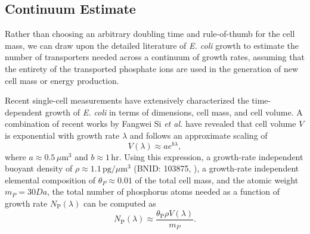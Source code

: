 \documentclass[letterpaper, 10pt]{article}
\begin{document}
\begin{figure}
\end{figure}


\subsection{Continuum Estimate}
Rather than choosing an arbitrary doubling time and rule-of-thumb for the cell
mass, we can draw upon the detailed literature of \textit{E. coli} growth to
estimate the number of transporters needed across a continuum of growth rates,
assuming that the entirety of the transported phosphate ions are used in the
generation of new cell mass or energy production. 

Recent single-cell measurements have extensively characterized the
time-dependent growth of \textit{E. coli} in terms of dimensions, cell mass, and
cell volume. A combination of recent works by Fangwei Si \textit{et al.}
\cite{si2017, si2019} have revealed that cell volume $V$ is exponential with
growth rate $\lambda$ and follows an approximate scaling of 
\begin{equation}
    V(\lambda) \approx ae^{b\lambda},
    \label{eq:si_vol}
\end{equation}
where $a \approx 0.5\,\mu\text{m}^3$ and $b\approx 1\,\text{hr}$. Using this expression, a growth-rate independent buoyant density of
$\rho \approx 1.1 \,\text{pg} / \mu\text{m}^3$ (BNID: 103875, \cite{milo2010}), a
growth-rate independent elemental composition of $\theta_P \approx 0.01$ of the
total cell mass, and the atomic weight $m_P = 30 Da$, the
total number of phosphorus atoms needed as a function of growth rate
$N_\text{P}(\lambda)$ can be
computed as 
\begin{equation}
    N_\text{P}(\lambda) \approx \frac{\theta_\text{P}\rho V(\lambda)}{m_{P}}.
\end{equation}
\end{document}
